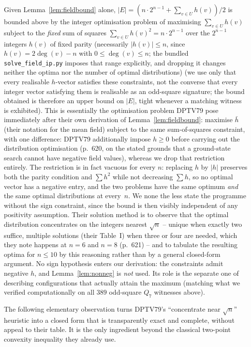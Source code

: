 \documentclass[12pt]{article}
\begin{document}
Given Lemma~\ref{lem:fieldbound} alone, $|E|=(n\cdot2^{n-1}+\sum_{v\in U}h(v))/2$
is bounded above by the integer optimisation problem of
maximising $\sum_{v\in U}h(v)$ subject to the \emph{fixed}
sum of squares $\sum_{v\in U}h(v)^2=n\cdot2^{n-1}$ over the $2^{n-1}$
integers $h(v)$ of fixed parity (necessarily $|h(v)|\le n$, since
$h(v)=2\deg(v)-n$ with $0\le\deg(v)\le n$; the bundled
\texttt{solve\_field\_ip.py} imposes that range explicitly, and dropping it
changes neither the optima nor the number of optimal distributions) (we use only that every
realisable $h$-vector satisfies these constraints, not the converse
that every integer vector satisfying them is realisable as an
odd-square signature; the bound obtained is therefore an upper bound on
$|E|$, tight whenever a matching witness is exhibited). This is
essentially the optimisation problem DPTV79 pose immediately after their
own derivation of Lemma~\ref{lem:fieldbound}: maximise $\bar h$ (their
notation for the mean field) subject to the same sum-of-squares
constraint, with one difference: DPTV79 additionally impose $h\ge0$ before
carrying out the distribution optimisation (p.~620, on the stated grounds
that a ground-state search cannot have negative field values), whereas we
drop that restriction entirely. The restriction is in fact vacuous for every $n$:
replacing $h$ by $|h|$ preserves both the parity condition and
$\sum h^2$ while not decreasing $\sum h$, so no optimal vector has a
negative entry, and the two problems have the same optimum \emph{and} the
same optimal distributions at every~$n$. We none the less state the
programme without the sign constraint, since the bound is then visibly
independent of any positivity assumption. Their
solution method is to observe that the optimal
distribution concentrates on the integers nearest $\sqrt n$ -- unique
when exactly two suffice, multiple solutions (their Table~I) when three
or four are needed, which they note happens at $n=6$ and $n=8$ (p.~621) -- and
to tabulate the resulting optima for $n\le10$ by this reasoning rather
than by a general closed-form argument. No sign
hypothesis enters our derivation: the constraints admit negative $h$, and
Lemma~\ref{lem:nonneg} is \emph{not} used. Its role
is the separate one of describing configurations that actually attain
the maximum (matching what we verified computationally on all $389$
odd-square $Q_7$ witnesses above).

The following elementary observation turns DPTV79's ``concentrate near
$\sqrt n$'' heuristic into a closed form that is transparently exact and
complete, without appeal to their table. It is the only ingredient
beyond the classical two-point convexity inequality they already use.
\end{document}
